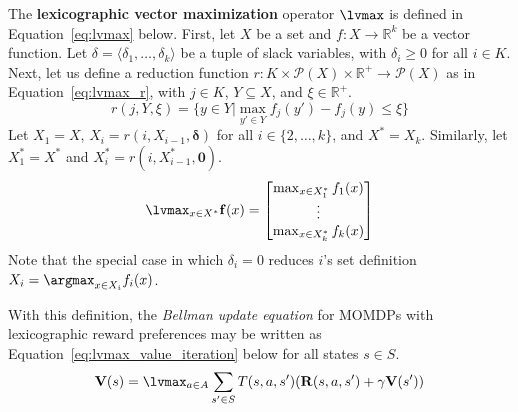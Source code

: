 \begin{definition}
\label{def:lvmax}
The \textbf{lexicographic vector maximization} operator $\lvmax$ is defined in Equation~\ref{eq:lvmax} below. First, let $X$ be a set and $f : X \rightarrow \mathbb{R}^k$ be a vector function. Let $\delta = \langle \delta_1, \ldots, \delta_k \rangle$ be a tuple of slack variables, with $\delta_i \geq 0$ for all $i \in K$. Next, let us define a reduction function $r : K \times \mathcal{P}(X) \times \mathbb{R}^+ \rightarrow \mathcal{P}(X)$ as in Equation~\ref{eq:lvmax_r}, with $j \in K$, $Y \subseteq X$, and $\xi \in \mathbb{R}^+$.
\begin{equation}
    \label{eq:lvmax_r}
    r(j, Y, \xi) = \{y \in Y | \max_{y' \in Y} f_j(y') - f_j(y) \leq \xi \}
\end{equation}
Let $X_1 = X$, $X_i = r(i, X_{i-1}, \mathbf{\delta})$ for all $i \in \{2, \ldots, k\}$, and $X^* = X_k$. Similarly, let $X_1^* = X^*$ and $X_i^* = r(i, X_{i-1}^*, \mathbf{0})$.
\begin{equation}
    \label{eq:lvmax}
    \lvmax_{x \in X^*} \mathbf{f}(x) = \begin{bmatrix}
            \max_{x \in X_1^*} f_1(x) \\
            \vdots \\
            \max_{x \in X_k^*} f_k(x)
        \end{bmatrix}
\end{equation}
Note that the special case in which $\delta_i = 0$ reduces $i$'s set definition $X_i = \argmax_{x \in X_i} f_i(x)$.
\end{definition}

With this definition, the \emph{Bellman update equation} for MOMDPs with lexicographic reward preferences may be written as Equation~\ref{eq:lvmax_value_iteration} below for all states $s \in S$.
\begin{equation}
    \label{eq:lvmax_value_iteration}
    \mathbf{V}(s) = \lvmax_{a \in A} \sum_{s' \in S} T(s, a, s') (\mathbf{R}(s, a, s') + \gamma \mathbf{V}(s'))
\end{equation}
